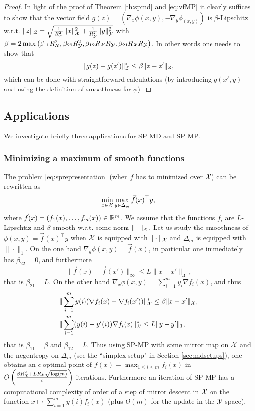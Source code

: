\begin{proof}
In light of the proof of Theorem \ref{th:spmd} and \eqref{eq:vfMP} it clearly suffices to show that the vector field $g(z) = (\nabla_x \phi(x,y), - \nabla_y \phi_(x,y))$ is $\beta$-Lipschitz w.r.t. $\|z\|_{\mathcal{Z}} = \sqrt{\frac{1}{R_{\mathcal{X}}^2} \|x\|_{\mathcal{X}}^2 + \frac{1}{R_{\mathcal{Y}}^2} \|y\|_{\mathcal{Y}}^2}$ with $\beta = 2 \max \left(\beta_{11} R^2_{\mathcal{X}}, \beta_{22} R^2_{\mathcal{Y}}, \beta_{12} R_{\mathcal{X}} R_{\mathcal{Y}}, \beta_{21} R_{\mathcal{X}} R_{\mathcal{Y}}\right)$. In other words one needs to show that
$$\|g(z) - g(z')\|_{\mathcal{Z}}^* \leq \beta \|z - z'\|_{\mathcal{Z}} ,$$
which can be done with straightforward calculations (by introducing $g(x',y)$ and using the definition of smoothness for $\phi$).
\end{proof}

\subsection{Applications} \label{sec:spex}
We investigate briefly three applications for SP-MD and SP-MP.

\subsubsection{Minimizing a maximum of smooth functions} \label{sec:spex1}
The problem \eqref{eq:sprepresentation} (when $f$ has to minimized over $\mathcal{X}$) can be rewritten as
$$\min_{x \in \mathcal{X}} \max_{y \in \Delta_m} \vec{f}(x)^{\top} y ,$$
where $\vec{f}(x) = (f_1(x), \hdots, f_m(x)) \in \mathbb{R}^m$. We assume that the functions $f_i$ are $L$-Lipschtiz and $\beta$-smooth w.r.t. some norm $\|\cdot\|_{\mathcal{X}}$. Let us study the smoothness of $\phi(x,y) = \vec{f}(x)^{\top} y$ when $\mathcal{X}$ is equipped with $\|\cdot\|_{\mathcal{X}}$ and $\Delta_m$ is equipped with $\|\cdot\|_1$. On the one hand $\nabla_y \phi(x,y) = \vec{f}(x)$, in particular one immediately has $\beta_{22}=0$, and furthermore
$$ \|\vec{f}(x)  - \vec{f}(x') \|_{\infty} \leq L \|x-x'\|_{\mathcal{X}} , $$
that is $\beta_{21}=L$. On the other hand $\nabla_x \phi(x,y) = \sum_{i=1}^m y_i \nabla f_i(x)$, and thus
\begin{align*}
& \|\sum_{i=1}^m y(i) (\nabla f_i(x) - \nabla f_i(x')) \|_{\mathcal{X}}^* \leq \beta \|x-x'\|_{\mathcal{X}} , \\
& \|\sum_{i=1}^m (y(i)-y'(i)) \nabla f_i(x) \|_{\mathcal{X}}^* \leq L\|y-y'\|_1 ,
\end{align*}
that is $\beta_{11} = \beta$ and $\beta_{12} = L$. Thus using SP-MP with some mirror map on $\mathcal{X}$ and the negentropy on $\Delta_m$ (see the ``simplex setup" in Section \ref{sec:mdsetups}), one obtains an $\epsilon$-optimal point of $f(x) = \max_{1 \leq i \leq m} f_i(x)$ in $O\left(\frac{\beta R_{\mathcal{X}}^2 + L R_{\mathcal{X}} \sqrt{\log(m)}}{\varepsilon} \right)$ iterations. Furthermore an iteration of SP-MP has a computational complexity of order of a step of mirror descent in $\mathcal{X}$ on the function $x \mapsto \sum_{i=1}^m y(i) f_i(x)$ (plus $O(m)$ for the update in the $\mathcal{Y}$-space).

